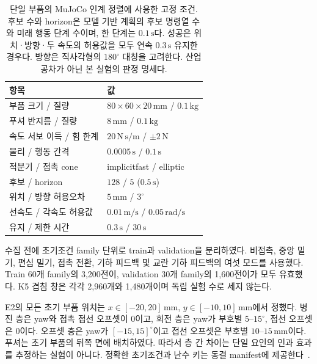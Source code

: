 \documentclass[conference,a4paper]{IEEEtran}
\begin{document}
\begin{table}[t]
\caption{단일 부품의 MuJoCo 인계 정렬에 사용한 고정 조건.
후보 수와 horizon은 모델 기반 계획의 후보 명령열 수와 미래 행동 단계 수이며, 한 단계는 $0.1\,\mathrm s$다.
성공은 위치·방향·두 속도의 허용값을 모두 연속 $0.3\,\mathrm s$ 유지한 경우다.
방향은 직사각형의 $180^\circ$ 대칭을 고려한다. 산업 공차가 아닌 본 실험의 판정 명세다.}\label{tab:settings}
\centering\small
\begin{tabular}{@{}ll@{}}
\toprule 항목 & 값\\ \midrule
부품 크기 / 질량 & $80\times60\times20\,\mathrm{mm}$ / $0.1\,\mathrm{kg}$\\
푸셔 반지름 / 질량 & $8\,\mathrm{mm}$ / $0.1\,\mathrm{kg}$\\
속도 서보 이득 / 힘 한계 & $20\,\mathrm{N\,s/m}$ / $\pm2\,\mathrm N$\\
물리 / 행동 간격 & $0.0005\,\mathrm s$ / $0.1\,\mathrm s$\\
적분기 / 접촉 cone & implicitfast / elliptic\\
후보 / horizon & $128$ / $5$ ($0.5\,\mathrm s$)\\
위치 / 방향 허용오차 & $5\,\mathrm{mm}$ / $3^\circ$\\
선속도 / 각속도 허용값 & $0.01\,\mathrm{m/s}$ / $0.05\,\mathrm{rad/s}$\\
유지 / 제한 시간 & $0.3\,\mathrm s$ / $30\,\mathrm s$\\
\bottomrule
\end{tabular}
\end{table}

수집 전에 초기조건 family 단위로 train과 validation을 분리하였다.
비접촉, 중앙 밀기, 편심 밀기, 접촉 전환, 기하 피드백 및 교란 기하 피드백의 여섯 모드를 사용했다.
Train 60개 family의 3,200전이, validation 30개 family의 1,600전이가 모두 유효했다.
K5 겹침 창은 각각 2,960개와 1,480개이며 독립 실험 수로 세지 않는다.

E2의 모든 초기 부품 위치는 $x\in[-20,20]\,\mathrm{mm}$, $y\in[-10,10]\,\mathrm{mm}$에서 정했다.
병진 층은 yaw와 접촉 접선 오프셋이 0이고, 회전 층은 yaw가 부호별 $5$--$15^\circ$, 접선 오프셋은 0이다.
오프셋 층은 yaw가 $[-15,15]^\circ$이고 접선 오프셋은 부호별 $10$--$15\,\mathrm{mm}$이다.
푸셔는 초기 부품의 뒤쪽 면에 배치하였다.
따라서 층 간 차이는 단일 요인의 인과 효과를 추정하는 실험이 아니다.
정확한 초기조건과 난수 키는 동결 manifest에 제공한다~\cite{repository}.
\end{document}
